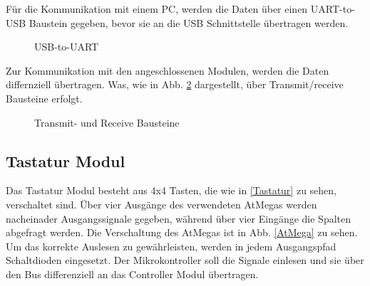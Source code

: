 Für die Kommunikation mit einem PC, werden die Daten über einen UART-to-USB Baustein gegeben, bevor sie an die USB Schnittstelle übertragen werden.


\begin{figure}[H]
    \centering    
    \caption{USB-to-UART}
    \label{USB}
\end{figure}

Zur Kommunikation mit den angeschlossenen Modulen, werden die Daten differnziell übertragen. Was, wie in Abb. \ref{T_R_Bausteine} dargestellt, 
über Transmit/receive Bausteine erfolgt.

\begin{figure}[H]
    \centering    
    \caption{Transmit- und Receive Bausteine}
    \label{T_R_Bausteine}
\end{figure}

\subsection{Tastatur Modul}
Das Tastatur Modul besteht aus 4x4 Tasten, die wie in \ref{Tastatur} zu sehen, verschaltet sind. Über vier Ausgänge des verwendeten AtMegas werden nacheinader 
Ausgangssignale gegeben, während über vier  Eingänge die Spalten abgefragt werden. Die Verschaltung des AtMegas ist in Abb. \ref{AtMega} zu sehen. Um das korrekte Auslesen zu gewährleisten, werden in jedem 
Ausgangspfad Schaltdioden eingesetzt. 
Der Mikrokontroller soll die Signale einlesen und sie über den Bus differenziell an das Controller Modul übertragen.


